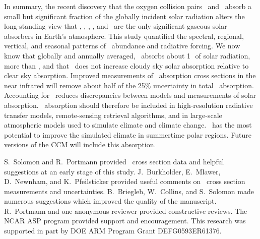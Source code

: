\documentclass[agupp,twoside]{aguplus} %
\begin{document}
In summary, the recent discovery that the oxygen collision pairs
\OdOd\ and \OdNd\ absorb a small but significant fraction of the
globally incident solar radiation alters the long-standing view that
\HdO, \Ot, \Od, \COd, and \NOd\ are the only significant gaseous solar
absorbers in Earth's atmosphere. 
This study quantified the spectral, regional, vertical, and seasonal
patterns of \OdX\ abundance and radiative forcing.
We now know that globally and annually averaged, \OdX\ absorbs about
1\,\wxmS\ of solar radiation, more than \COd, and that \OdX\ does not
increase cloudy sky solar absorption relative to clear sky absorption.
Improved measurements of \OdX\ absorption cross sections in the near 
infrared will remove about half of the 25\% uncertainty in total
\OdX\ absorption.
Accounting for \OdX\ reduces discrepancies between models and
measurements of solar absorption.
\OdX\ absorption should therefore be included in high-resolution
radiative transfer models, remote-sensing retrieval algorithms, and in
large-scale atmospheric models used to simulate climate and climate
change. 
\OdX\ has the most potential to improve the simulated climate
in summertime polar regions. 
Future versions of the CCM will include this absorption.

\balance

\appendix

\acknowledgments
S.~Solomon and R.~Portmann provided \OdX\ cross section data and
helpful suggestions at an early stage of this study.   
J.~Burkholder, E.~Mlawer, D.~Newnham, and K.~Pfeilsticker provided
useful comments on \OdOd\ cross section measurements and
uncertainties.  
B.~Briegleb, W.~Collins, and S.~Solomon made numerous suggestions
which improved the quality of the manuscript.
R.~Portmann and one anonymous reviewer provided constructive reviews.  
The NCAR ASP program provided support and encouragement. 
This research was supported in part by DOE ARM Program Grant
DEFG0593ER61376. 



\end{document}
